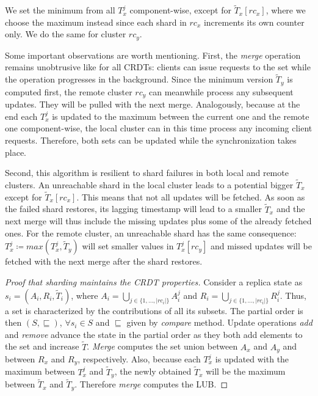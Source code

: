 We set the minimum from all $T_{x}^{j}$ component-wise, except for
$\tilde{T}_{x}[rc_{x}]$, where we choose the maximum instead since each shard in
$rc_{x}$ increments its own counter only. We do the same for cluster $rc_{y}$.

Some important observations are worth mentioning. First, the \textit{merge}
operation remains unobtrusive like for all CRDTs: clients can issue requests to
the set while the operation progresses in the background. Since the minimum
version $\tilde{T}_{y}$ is computed first, the remote cluster $rc_{y}$ can
meanwhile process any subsequent updates. They will be pulled with the next
merge. Analogously, because at the end each $T_{x}^{j}$ is updated to the
maximum between the current one and the remote one component-wise, the local
cluster can in this time process any incoming client requests. Therefore, both
sets can be updated while the synchronization takes place. 

Second, this algorithm is resilient to shard failures in both local and remote
clusters. An unreachable shard in the local cluster leads to a potential bigger
$\tilde{T}_{x}$ except for $\tilde{T}_{x}[rc_{x}]$. This means that not all
updates will be fetched. As soon as the failed shard restores, its lagging
timestamp will lead to a smaller $\tilde{T}_{x}$ and the next merge will thus
include the missing updates plus some of the already fetched ones. For the
remote cluster, an unreachable shard has the same consequence: $T_{x}^{j}
\coloneqq max(T_{x}^{j}, \tilde{T}_{y})$ will set smaller values in
$T_{x}^{j}[rc_{y}]$ and missed updates will be fetched with the next merge after
the shard restores.

\begin{proof}[Proof that sharding maintains the CRDT properties]
Consider a replica state as $s_{i} = (A_{i}, R_{i}, \tilde{T}_{i})$, where
$A_{i} = \bigcup_{j \in \{1,\ldots,|rc_{i}|\}} A_{i}^{j}$ and $R_{i} =
\bigcup_{j \in \{1,\ldots,|rc_{i}|\}} R_{i}^{j}$. Thus, a set is characterized
by the contributions of all its subsets. The partial order is then $(S,
\sqsubseteq)$, $\forall s_{i} \in S$ and $\sqsubseteq$ given by \textit{compare}
method. Update operations \textit{add} and \textit{remove} advance the state in
the partial order as they both add elements to the set and increase $\tilde{T}$.
\textit{Merge} computes the set union between $A_{x}$ and $A_{y}$ and between
$R_{x}$ and $R_{y}$, respectively. Also, because each $T_{x}^{j}$ is updated
with the maximum between $T_{x}^{j}$ and $\tilde{T}_{y}$, the newly obtained
$\tilde{T}_{x}$ will be the maximum between $\tilde{T}_{x}$ and $\tilde{T}_{y}$.
Therefore \textit{merge} computes the LUB.
\end{proof}